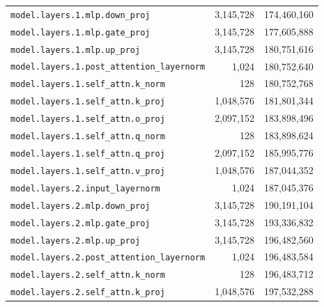 \documentclass[10pt,a4paper]{article}
\theoremstyle{definition}
\begin{document}
\begin{appendices}
\begin{longtable}{p{9.5cm}rr}
\texttt{model.\allowbreak{}layers.\allowbreak{}1.\allowbreak{}mlp.\allowbreak{}down\_proj} & 3,145,728 & 174,460,160 \\
\texttt{model.\allowbreak{}layers.\allowbreak{}1.\allowbreak{}mlp.\allowbreak{}gate\_proj} & 3,145,728 & 177,605,888 \\
\texttt{model.\allowbreak{}layers.\allowbreak{}1.\allowbreak{}mlp.\allowbreak{}up\_proj} & 3,145,728 & 180,751,616 \\
\texttt{model.\allowbreak{}layers.\allowbreak{}1.\allowbreak{}post\_attention\_layernorm} & 1,024 & 180,752,640 \\
\texttt{model.\allowbreak{}layers.\allowbreak{}1.\allowbreak{}self\_attn.\allowbreak{}k\_norm} & 128 & 180,752,768 \\
\texttt{model.\allowbreak{}layers.\allowbreak{}1.\allowbreak{}self\_attn.\allowbreak{}k\_proj} & 1,048,576 & 181,801,344 \\
\texttt{model.\allowbreak{}layers.\allowbreak{}1.\allowbreak{}self\_attn.\allowbreak{}o\_proj} & 2,097,152 & 183,898,496 \\
\texttt{model.\allowbreak{}layers.\allowbreak{}1.\allowbreak{}self\_attn.\allowbreak{}q\_norm} & 128 & 183,898,624 \\
\texttt{model.\allowbreak{}layers.\allowbreak{}1.\allowbreak{}self\_attn.\allowbreak{}q\_proj} & 2,097,152 & 185,995,776 \\
\texttt{model.\allowbreak{}layers.\allowbreak{}1.\allowbreak{}self\_attn.\allowbreak{}v\_proj} & 1,048,576 & 187,044,352 \\
\texttt{model.\allowbreak{}layers.\allowbreak{}2.\allowbreak{}input\_layernorm} & 1,024 & 187,045,376 \\
\texttt{model.\allowbreak{}layers.\allowbreak{}2.\allowbreak{}mlp.\allowbreak{}down\_proj} & 3,145,728 & 190,191,104 \\
\texttt{model.\allowbreak{}layers.\allowbreak{}2.\allowbreak{}mlp.\allowbreak{}gate\_proj} & 3,145,728 & 193,336,832 \\
\texttt{model.\allowbreak{}layers.\allowbreak{}2.\allowbreak{}mlp.\allowbreak{}up\_proj} & 3,145,728 & 196,482,560 \\
\texttt{model.\allowbreak{}layers.\allowbreak{}2.\allowbreak{}post\_attention\_layernorm} & 1,024 & 196,483,584 \\
\texttt{model.\allowbreak{}layers.\allowbreak{}2.\allowbreak{}self\_attn.\allowbreak{}k\_norm} & 128 & 196,483,712 \\
\texttt{model.\allowbreak{}layers.\allowbreak{}2.\allowbreak{}self\_attn.\allowbreak{}k\_proj} & 1,048,576 & 197,532,288 \\

\end{longtable}
\end{appendices}
\end{document}
